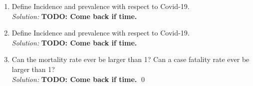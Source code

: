 \documentclass[10pt]{amsart}
\theoremstyle{nonumberplain}
\begin{document}
\begin{enumerate}[label={\bf {Question \arabic*}}]
\begin{enumerate}
\item Define Incidence and prevalence with respect to Covid-19. \\
\textit{Solution:}
\textbf{TODO: Come back if time.}

\item Define Incidence and prevalence with respect to Covid-19. \\
\textit{Solution:}
\textbf{TODO: Come back if time.}

\item Can the mortality rate ever be larger than 1? Can a case fatality rate ever be larger than 1? \\
\textit{Solution:}
\textbf{TODO: Come back if time.}
\qed \\

\end{enumerate}

\end{enumerate}
\end{document}
